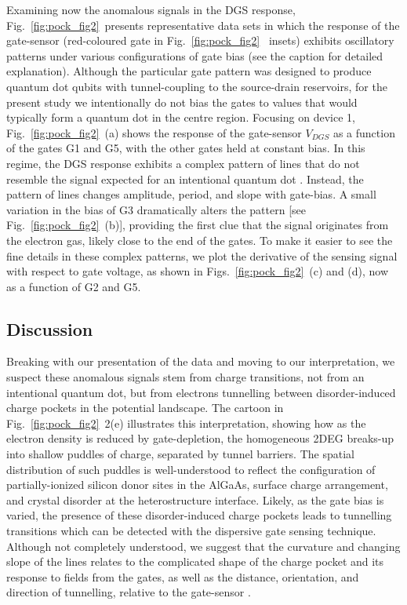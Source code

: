 Examining now the anomalous signals in the DGS response, Fig.~\ref{fig:pock_fig2}~presents representative data sets in which the response of the gate-sensor (red-coloured gate in Fig.~\ref{fig:pock_fig2}~ insets) exhibits oscillatory patterns under various configurations of gate bias (see the caption for detailed explanation). Although the particular gate pattern was designed to produce quantum dot qubits with tunnel-coupling to the source-drain reservoirs, for the present study we intentionally do not bias the gates to values that would typically form a quantum dot in the centre region. Focusing on device 1, Fig.~\ref{fig:pock_fig2}~(a) shows the response of the gate-sensor $V_{DGS}$ as a function of the gates G1 and G5, with the other gates held at constant bias. In this regime, the DGS response exhibits a complex pattern of lines that do not resemble the signal expected for an intentional quantum dot \cite{Colless_PRL}. Instead, the pattern of lines changes amplitude, period, and slope with gate-bias. A small variation in the bias of G3 dramatically alters the pattern [see Fig.~\ref{fig:pock_fig2}~(b)], providing the first clue that the signal originates from the electron gas, likely close to the end of the gates. To make it easier to see the fine details in these complex patterns, we plot the derivative of the sensing signal with respect to gate voltage, as shown in Figs.~\ref{fig:pock_fig2}~(c) and (d), now as a function of G2 and G5.

\subsection{Discussion}
Breaking with our presentation of the data and moving to our interpretation, we suspect these anomalous signals stem from charge transitions, not from an intentional quantum dot, but from electrons tunnelling between disorder-induced charge pockets in the potential landscape. The cartoon in Fig.~\ref{fig:pock_fig2}~2(e) illustrates this interpretation, showing how as the electron density is reduced by gate-depletion, the homogeneous 2DEG breaks-up into shallow puddles of charge, separated by tunnel barriers. The spatial distribution of such puddles is well-understood \cite{PhysRevB.41.7929,Ilani1354} to reflect the configuration of partially-ionized silicon donor sites in the AlGaAs, surface charge arrangement, and crystal disorder at the heterostructure interface. Likely, as the gate bias is varied, the presence of these disorder-induced charge pockets leads to tunnelling transitions which can be detected with the dispersive gate sensing technique. Although not completely understood, we suggest that the curvature and changing slope of the lines relates to the complicated shape of the charge pocket and its response to fields from the gates, as well as the distance, orientation, and direction of tunnelling, relative to the gate-sensor \cite{Ilani1354}.


